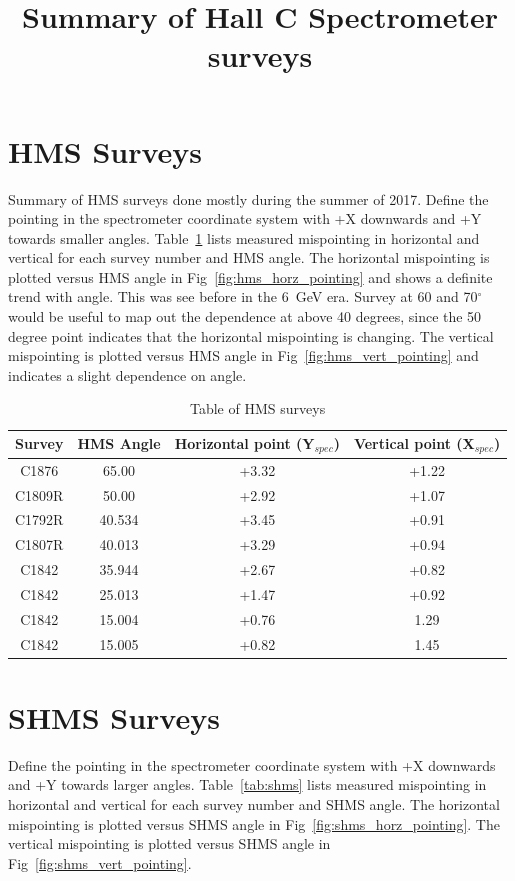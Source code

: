 \documentclass[]{article}
\title{Summary of Hall C Spectrometer surveys}
\begin{document}
\section{HMS Surveys}
	Summary of HMS surveys done mostly during the summer of 2017. Define the pointing in the spectrometer coordinate system with +X downwards and +Y towards smaller angles.
		Table~\ref{tab:hms} lists measured mispointing in horizontal and vertical for each survey number and HMS angle. The horizontal mispointing is plotted versus HMS angle in Fig~\ref{fig:hms_horz_pointing} and shows a definite trend with angle. This was see before in the 6~GeV era. Survey at 60 and 70$^{\circ}$ would be useful to map out the dependence at above 40 degrees, since the 50 degree point indicates that the horizontal mispointing is changing. The vertical mispointing is plotted versus
		HMS angle in Fig~\ref{fig:hms_vert_pointing} and indicates a slight dependence on
		angle.
	
	\begin{table}[h]
	\begin{center}
	\begin{tabular}[]{|c|c||c|c|} \hline\hline
		Survey & HMS Angle  & Horizontal point (Y$_{spec}$) & Vertical point (X$_{spec}$)\\ \hline
		C1876  & 65.00  & +3.32 & +1.22 \\ \hline
		C1809R & 50.00  & +2.92 & +1.07 \\ \hline
		C1792R & 40.534 & +3.45& +0.91\\ \hline
		C1807R & 40.013 & +3.29 & +0.94 \\ \hline
		C1842 & 35.944 & +2.67 & +0.82\\ \hline
		C1842  & 25.013 & +1.47 &  +0.92 \\ \hline
		C1842  & 15.004 & +0.76 & 1.29\\ \hline
			C1842  & 15.005 & +0.82 & 1.45 \\ \hline
	\end{tabular}
	\caption{Table of HMS surveys}
	\label{tab:hms}
				\end{center}
	\end{table}


\section{SHMS Surveys}
Define the pointing in the spectrometer coordinate system with +X downwards and +Y towards larger angles.
Table~\ref{tab:shms} lists measured mispointing in horizontal and vertical for each survey number and SHMS angle. The horizontal mispointing is plotted versus SHMS angle in Fig~\ref{fig:shms_horz_pointing}.  The vertical mispointing is plotted versus
SHMS angle in Fig~\ref{fig:shms_vert_pointing}. 
			
\end{document}
